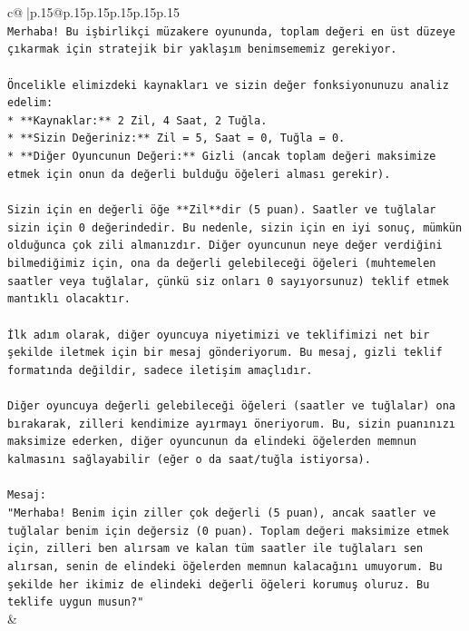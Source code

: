 \documentclass{article}
\begin{document}
{\begin{supertabular}{c@{$\;$}|p{.15\linewidth}@{}p{.15\linewidth}p{.15\linewidth}p{.15\linewidth}p{.15\linewidth}p{.15\linewidth}}
{{{\\ 
\texttt{Merhaba! Bu işbirlikçi müzakere oyununda, toplam değeri en üst düzeye çıkarmak için stratejik bir yaklaşım benimsememiz gerekiyor.} \\
\\ 
\texttt{Öncelikle elimizdeki kaynakları ve sizin değer fonksiyonunuzu analiz edelim:} \\
\texttt{*   **Kaynaklar:** 2 Zil, 4 Saat, 2 Tuğla.} \\
\texttt{*   **Sizin Değeriniz:** Zil = 5, Saat = 0, Tuğla = 0.} \\
\texttt{*   **Diğer Oyuncunun Değeri:** Gizli (ancak toplam değeri maksimize etmek için onun da değerli bulduğu öğeleri alması gerekir).} \\
\\ 
\texttt{Sizin için en değerli öğe **Zil**dir (5 puan). Saatler ve tuğlalar sizin için 0 değerindedir. Bu nedenle, sizin için en iyi sonuç, mümkün olduğunca çok zili almanızdır. Diğer oyuncunun neye değer verdiğini bilmediğimiz için, ona da değerli gelebileceği öğeleri (muhtemelen saatler veya tuğlalar, çünkü siz onları 0 sayıyorsunuz) teklif etmek mantıklı olacaktır.} \\
\\ 
\texttt{İlk adım olarak, diğer oyuncuya niyetimizi ve teklifimizi net bir şekilde iletmek için bir mesaj gönderiyorum. Bu mesaj, gizli teklif formatında değildir, sadece iletişim amaçlıdır.} \\
\\ 
\texttt{Diğer oyuncuya değerli gelebileceği öğeleri (saatler ve tuğlalar) ona bırakarak, zilleri kendimize ayırmayı öneriyorum. Bu, sizin puanınızı maksimize ederken, diğer oyuncunun da elindeki öğelerden memnun kalmasını sağlayabilir (eğer o da saat/tuğla istiyorsa).} \\
\\ 
\texttt{Mesaj:} \\
\texttt{"Merhaba! Benim için ziller çok değerli (5 puan), ancak saatler ve tuğlalar benim için değersiz (0 puan). Toplam değeri maksimize etmek için, zilleri ben alırsam ve kalan tüm saatler ile tuğlaları sen alırsan, senin de elindeki öğelerden memnun kalacağını umuyorum. Bu şekilde her ikimiz de elindeki değerli öğeleri korumuş oluruz. Bu teklife uygun musun?"} \\
            }
        }
    }
    & \\ \\


\end{supertabular}}
\end{document}
